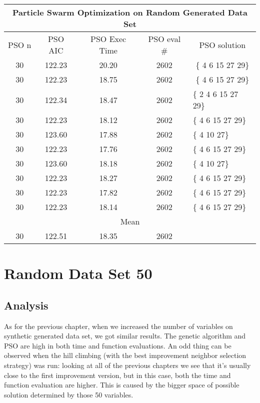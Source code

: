 \begin{tabular}{|c|c|c|c|l|}
	\hline
	\multicolumn{5}{|c|}{Particle Swarm Optimization on Random Generated Data Set}                          \\ \hline
	PSO n & PSO AIC     & PSO Exec Time & PSO eval \# & \multicolumn{1}{c|}{PSO solution}      \\ \hline
	30    & 122.23 & 20.20             & 2602                   & \multicolumn{1}{c|}{\{ 4 6 15 27 29\}} \\ \hline
	30    & 122.23 & 18.75             & 2602                   & \multicolumn{1}{c|}{\{ 4 6 15 27 29\}} \\ \hline
	30    & 122.34  & 18.47             & 2602                   & \{ 2 4 6 15 27 29\}                    \\ \hline
	30    & 122.23 & 18.12             & 2602                   & \{ 4 6 15 27 29\}                      \\ \hline
	30    & 123.60 & 17.88            & 2602                   & \{ 4 10 27\}                           \\ \hline
	30    & 122.23 & 17.76             & 2602                   & \{ 4 6 15 27 29\}                      \\ \hline
	30    & 123.60 & 18.18              & 2602                   & \{ 4 10 27\}                           \\ \hline
	30    & 122.23 & 18.27             & 2602                   & \{ 4 6 15 27 29\}                      \\ \hline
	30    & 122.23 & 17.82             & 2602                   & \{ 4 6 15 27 29\}                      \\ \hline
	30    & 122.23 & 18.14             & 2602                   & \{ 4 6 15 27 29\}                      \\ \hline
	\multicolumn{5}{|c|}{Mean}                                                                                 \\ \hline
	30    & 122.51 & 18.35            & 2602                   &                                        \\ \hline
\end{tabular}

\section{Random Data Set 50}
\subsection{Analysis}
As for the previous chapter, when we increased the number of variables on synthetic generated data set, we got similar results. The genetic algorithm and PSO are high in both time and function evaluations. An odd thing can be observed when the hill climbing (with the best improvement neighbor selection strategy) was run: looking at all of the previous chapters we see that it's usually close to the first improvement version, but in this case, both the time and function evaluation are higher. This is caused by the bigger space of possible solution determined by those 50 variables.


